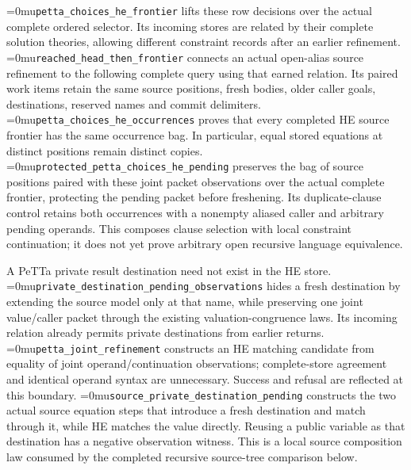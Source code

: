 \documentclass[11pt,a4paper]{article}
\newcommand{\name}[1]{\textup{\Urlmuskip=0mu\relax\nolinkurl{#1}}}
\begin{document}
\name{petta_choices_he_frontier} lifts these row decisions over the actual
complete ordered selector. Its incoming stores are related by their complete
solution theories, allowing different constraint records after an earlier
refinement. \name{reached_head_then_frontier} connects an actual open-alias
source refinement to the following complete query using that earned relation.
Its paired work items retain the same source
positions, fresh bodies, older caller goals, destinations, reserved names and
commit delimiters. \name{petta_choices_he_occurrences} proves that every
completed HE source frontier has the same occurrence bag. In particular,
equal stored equations at distinct positions remain distinct copies.
\name{protected_petta_choices_he_pending} preserves the bag of source
positions paired with these joint packet observations over the actual
complete frontier, protecting the pending packet before freshening.
Its duplicate-clause control retains both occurrences
with a nonempty aliased caller and arbitrary pending operands. This composes
clause selection with local constraint continuation; it does not yet prove
arbitrary open recursive language equivalence.

A PeTTa private result destination need not exist in the HE store.
\name{private_destination_pending_observations} hides a fresh destination
by extending the source model only at that name, while preserving one
joint value/caller packet through the existing valuation-congruence laws.
Its incoming relation already permits private destinations from earlier
returns. \name{petta_joint_refinement} constructs an HE
matching candidate from equality of joint operand/continuation observations;
complete-store agreement and identical operand syntax are unnecessary.
Success and refusal are reflected at this boundary.
\name{source_private_destination_pending} constructs the two actual source
equation steps that introduce a fresh destination and match through it,
while HE matches the value directly. Reusing a public variable as that
destination has a negative observation witness. This is a local source
composition law consumed by the completed recursive source-tree comparison
below.
\end{document}
